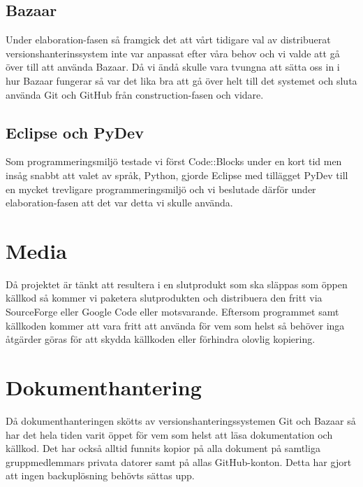 \subsection{Bazaar}
Under elaboration-fasen så framgick det att vårt tidigare val av distribuerat versionshanterinssystem inte var anpassat efter våra behov och vi valde att gå över till att använda Bazaar. Då vi ändå skulle vara tvungna att sätta oss in i hur Bazaar fungerar så var det lika bra att gå över helt till det systemet och sluta använda Git och GitHub från construction-fasen och vidare.

\subsection{Eclipse och PyDev}
Som programmeringsmiljö testade vi först Code::Blocks under en kort tid men insåg snabbt att valet av språk, Python, gjorde Eclipse med tillägget PyDev till en mycket trevligare programmeringsmiljö och vi beslutade därför under elaboration-fasen att det var detta vi skulle använda.

\section{Media}
Då projektet är tänkt att resultera i en slutprodukt som ska släppas som öppen källkod så kommer vi paketera slutprodukten och distribuera den fritt via SourceForge eller Google Code eller motsvarande. Eftersom programmet samt källkoden kommer att vara fritt att använda för vem som helst så behöver inga åtgärder göras för att skydda källkoden eller förhindra olovlig kopiering.

\section{Dokumenthantering}
Då dokumenthanteringen skötts av versionshanteringssystemen Git och Bazaar så har det hela tiden varit öppet för vem som helst att läsa dokumentation och källkod. Det har också alltid funnits kopior på alla dokument på samtliga gruppmedlemmars privata datorer samt på allas GitHub-konton. Detta har gjort att ingen backuplösning behövts sättas upp.

